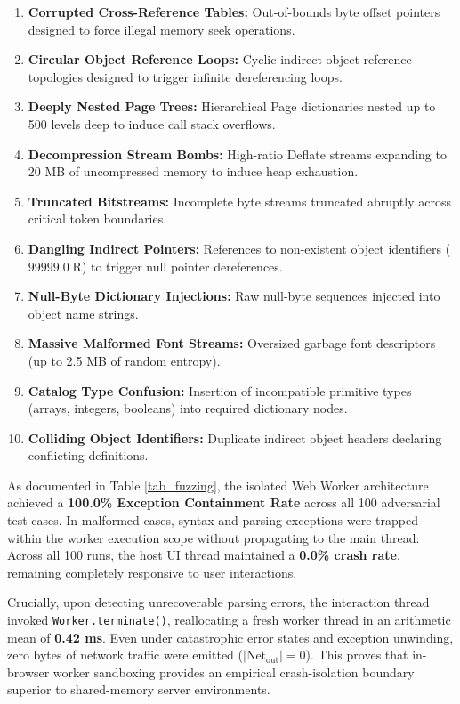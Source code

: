 \documentclass[journal]{IEEEtran}
\begin{document}
\begin{enumerate}[leftmargin=12pt, topsep=2pt, itemsep=1pt]
\item \textbf{Corrupted Cross-Reference Tables:} Out-of-bounds byte offset pointers designed to force illegal memory seek operations.
\item \textbf{Circular Object Reference Loops:} Cyclic indirect object reference topologies designed to trigger infinite dereferencing loops.
\item \textbf{Deeply Nested Page Trees:} Hierarchical Page dictionaries nested up to 500 levels deep to induce call stack overflows.
\item \textbf{Decompression Stream Bombs:} High-ratio Deflate streams expanding to 20 MB of uncompressed memory to induce heap exhaustion.
\item \textbf{Truncated Bitstreams:} Incomplete byte streams truncated abruptly across critical token boundaries.
\item \textbf{Dangling Indirect Pointers:} References to non-existent object identifiers ($99999 \; 0 \; \text{R}$) to trigger null pointer dereferences.
\item \textbf{Null-Byte Dictionary Injections:} Raw null-byte sequences injected into object name strings.
\item \textbf{Massive Malformed Font Streams:} Oversized garbage font descriptors (up to 2.5 MB of random entropy).
\item \textbf{Catalog Type Confusion:} Insertion of incompatible primitive types (arrays, integers, booleans) into required dictionary nodes.
\item \textbf{Colliding Object Identifiers:} Duplicate indirect object headers declaring conflicting definitions.
\end{enumerate}

As documented in Table \ref{tab_fuzzing}, the isolated Web Worker architecture achieved a \textbf{100.0\% Exception Containment Rate} across all 100 adversarial test cases. In malformed cases, syntax and parsing exceptions were trapped within the worker execution scope without propagating to the main thread. Across all 100 runs, the host UI thread maintained a \textbf{0.0\% crash rate}, remaining completely responsive to user interactions. 

Crucially, upon detecting unrecoverable parsing errors, the interaction thread invoked \texttt{Worker.terminate()}, reallocating a fresh worker thread in an arithmetic mean of \textbf{0.42 ms}. Even under catastrophic error states and exception unwinding, zero bytes of network traffic were emitted ($|\text{Net}_{\text{out}}| = 0$). This proves that in-browser worker sandboxing provides an empirical crash-isolation boundary superior to shared-memory server environments.
\end{document}
